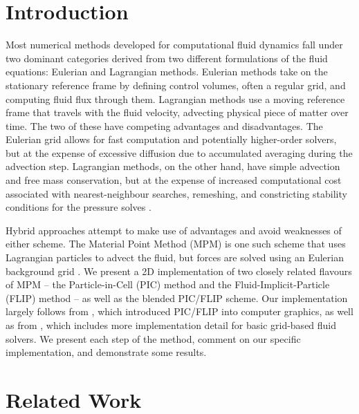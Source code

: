 \documentclass[sigconf]{acmart}
\begin{document}
\maketitle

\section{Introduction}

Most numerical methods developed for computational fluid dynamics fall under two dominant categories derived from two different formulations of the fluid equations: Eulerian and Lagrangian methods. Eulerian methods take on the stationary reference frame by defining control volumes, often a regular grid, and computing fluid flux through them. Lagrangian methods use a moving reference frame that travels with the fluid velocity, advecting physical piece of matter over time. The two of these have competing advantages and disadvantages. The Eulerian grid allows for fast computation and potentially higher-order solvers, but at the expense of excessive diffusion due to accumulated averaging during the advection step. Lagrangian methods, on the other hand, have simple advection and free mass conservation, but at the expense of increased computational cost associated with nearest-neighbour searches, remeshing, and constricting stability conditions for the pressure solves \cite{zhu2005}.

Hybrid approaches attempt to make use of advantages and avoid weaknesses of either scheme. The Material Point Method (MPM) is one such scheme that uses Lagrangian particles to advect the fluid, but forces are solved using an Eulerian background grid \cite{JiangCourse}. We present a 2D implementation of two closely related flavours of MPM -- the Particle-in-Cell (PIC) method and the Fluid-Implicit-Particle (FLIP) method -- as well as the blended PIC/FLIP scheme. Our implementation largely follows from \cite{zhu2005}, which introduced PIC/FLIP into computer graphics, as well as from \cite{bridson2015}, which includes more implementation detail for basic grid-based fluid solvers. We present each step of the method, comment on our specific implementation, and demonstrate some results.

\section{Related Work}
\end{document}

